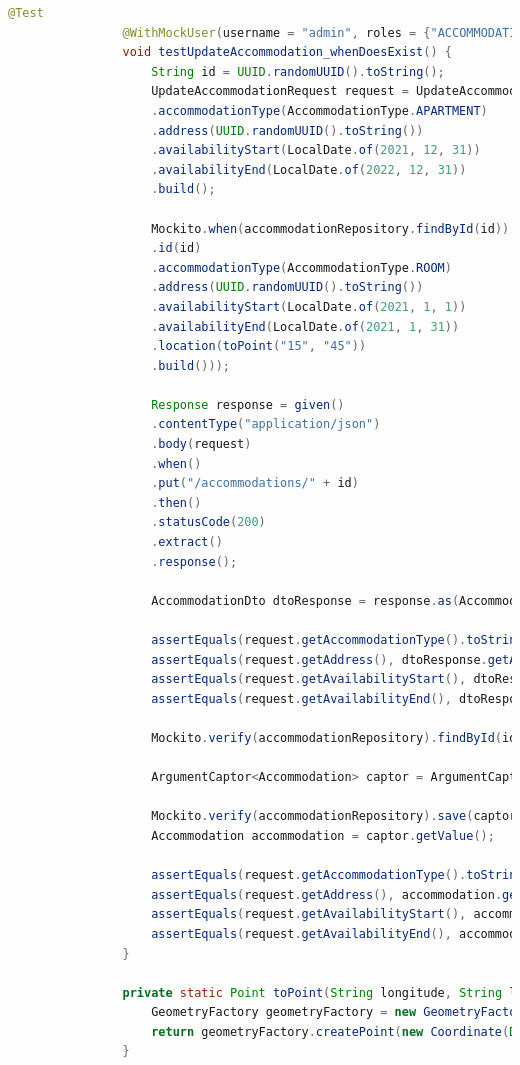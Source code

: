 			\begin{lstlisting}[language=Java]
				@Test
				@WithMockUser(username = "admin", roles = {"ACCOMMODATION", "TRANSPORT", "PATIENT"})
				void testUpdateAccommodation_whenDoesExist() {
					String id = UUID.randomUUID().toString();
					UpdateAccommodationRequest request = UpdateAccommodationRequest.builder()
					.accommodationType(AccommodationType.APARTMENT)
					.address(UUID.randomUUID().toString())
					.availabilityStart(LocalDate.of(2021, 12, 31))
					.availabilityEnd(LocalDate.of(2022, 12, 31))
					.build();
					
					Mockito.when(accommodationRepository.findById(id)).thenReturn(Optional.of(Accommodation.builder()
					.id(id)
					.accommodationType(AccommodationType.ROOM)
					.address(UUID.randomUUID().toString())
					.availabilityStart(LocalDate.of(2021, 1, 1))
					.availabilityEnd(LocalDate.of(2021, 1, 31))
					.location(toPoint("15", "45"))
					.build()));
					
					Response response = given()
					.contentType("application/json")
					.body(request)
					.when()
					.put("/accommodations/" + id)
					.then()
					.statusCode(200)
					.extract()
					.response();
					
					AccommodationDto dtoResponse = response.as(AccommodationDto.class);
					
					assertEquals(request.getAccommodationType().toString(), dtoResponse.getAccommodationType().toString());
					assertEquals(request.getAddress(), dtoResponse.getAddress());
					assertEquals(request.getAvailabilityStart(), dtoResponse.getAvailabilityStart());
					assertEquals(request.getAvailabilityEnd(), dtoResponse.getAvailabilityEnd());
					
					Mockito.verify(accommodationRepository).findById(id);
					
					ArgumentCaptor<Accommodation> captor = ArgumentCaptor.forClass(Accommodation.class);
					
					Mockito.verify(accommodationRepository).save(captor.capture());
					Accommodation accommodation = captor.getValue();
					
					assertEquals(request.getAccommodationType().toString(), accommodation.getAccommodationType().toString());
					assertEquals(request.getAddress(), accommodation.getAddress());
					assertEquals(request.getAvailabilityStart(), accommodation.getAvailabilityStart());
					assertEquals(request.getAvailabilityEnd(), accommodation.getAvailabilityEnd());
				}
				
				private static Point toPoint(String longitude, String latitude) {
					GeometryFactory geometryFactory = new GeometryFactory();
					return geometryFactory.createPoint(new Coordinate(Double.parseDouble(longitude), Double.parseDouble(latitude)));
				}
			\end{lstlisting}
			

